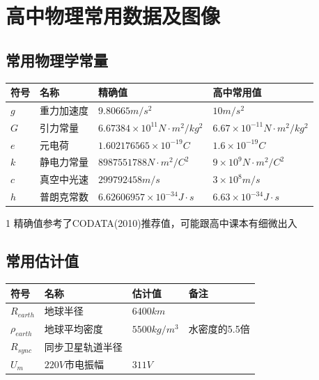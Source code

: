 
\chapter{高中物理常用数据及图像}

\section{常用物理学常量}

\begin{table}[h]
\centering
\begin{threeparttable}
\begin{tabular}{|l|l|l|l|}
\hline
\textbf{符号} & \textbf{名称} & \textbf{精确值}\tnote{1} & \textbf{高中常用值}\\
\hline
$g$ & 重力加速度 & $9.80665 m/s^2$ & $10m/s^2$ \\
$G$ & 引力常量 & $6.67384 \times 10^{11} N \cdot m^2/kg^2$ & $6.67 \times 10^{-11} N \cdot m^2/kg^2$ \\
$e$ & 元电荷 & $1.602176565 \times 10^{-19} C$ & $1.6 \times 10^{-19} C$ \\ 
$k$ &  静电力常量 & $8987551788 N \cdot m^2 / C^2$ & $9 \times 10^{9} N \cdot m^2 /C^2$ \\
$c$ & 真空中光速 & $299792458 m/s$ & $3 \times 10^{8} m/s$ \\
$h$ & 普朗克常数 & $6.62606957 \times 10^{-34} J \cdot s$ & $6.63 \times 10^{-34} J \cdot s$ \\
\hline
\end{tabular}
\begin{tablenotes}
\item[1] 精确值参考了CODATA(2010)推荐值，可能跟高中课本有细微出入
\end{tablenotes}
\end{threeparttable}
\end{table}

\section{常用估计值}

\begin{center}
\begin{tabular}{|l|l|l|l|}
\hline
\textbf{符号} & \textbf{名称} & \textbf{估计值} & \textbf{备注} \\
\hline
$R_{earth}$ & 地球半径  & $6400 km$  & \\
$\rho_{earth}$ & 地球平均密度 & $5500 kg/m^3$ & 水密度的5.5倍 \\
$R_{sync}$ & 同步卫星轨道半径  &  & \\
$U_{m}$ & $220V$市电振幅 & $311 V$ & \\
\hline
\end{tabular}
\end{center}

